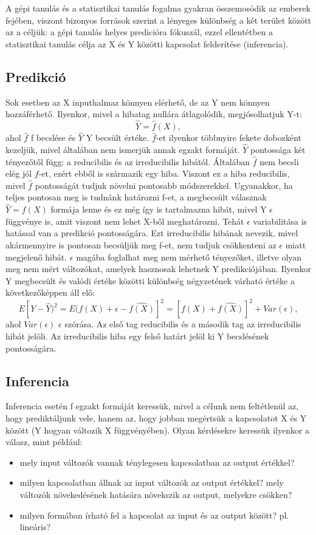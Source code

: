 \documentclass[12pt]{article}
\theoremstyle{plain}
\begin{document}
A gépi tanulás és a statisztikai tanulás fogalma gyakran összemosódik az emberek fejében, viszont bizonyos források szerint a lényeges különbség a két terület között az a céljük: a gépi tanulás helyes predicióra fókuszál, ezzel ellentétben a statisztikai tanulás célja az X és Y közötti kapcsolat felderítése (inferencia). 

\subsection{Predikció}
Sok esetben az X inputhalmaz könnyen elérhető, de az Y nem könnyen hozzáférhető. Ilyenkor, mivel a hibatag nullára átlagolódik, megjósolhatjuk Y-t: $$ \hat{Y} = \hat{f}(X), $$ ahol $\hat{f}$ f becslése és $\hat{Y}$ Y becsült értéke. $\hat{f}$-et ilyenkor többnyire fekete dobozként kezeljük, mivel általában nem ismerjük annak egzakt formáját. $\hat{Y}$ pontossága két tényezőtől függ: a reducibilis és az irreducibilis hibától. Általában $\hat{f}$ nem becsli elég jól $f$-et, ezért ebből is származik egy hiba. Viszont ez a hiba reducibilis, mivel $\hat{f}$ pontosságát tudjuk növelni pontosabb módszerekkel. Ugyanakkor, ha teljes pontosan meg is tudnánk határozni f-et, a megbecsült válasznak $\hat{Y} = f(X)$ formája lenne és ez még így is tartalmazna hibát, mivel Y $\epsilon$ függvénye is, amit viszont nem lehet X-ből meghatározni. Tehát $\epsilon$ variabilitása is hatással van a predikció pontosságára. Ezt irreducibilis hibának nevezik, mivel akármennyire is pontosan becsüljük meg f-et, nem tudjuk csökkenteni az $\epsilon$ miatt megjelenő hibát. $\epsilon$ magába foglalhat meg nem mérhető tényezőket, illetve olyan meg nem mért változókat, amelyek hasznosak lehetnek Y predikciójában. Ilyenkor Y megbecsült és valódi értéke közötti különbség négyzetének várható értéke a következőképpen áll elő: $$ E[Y-\hat{Y})^2= E(f(X)+\epsilon-\hat{f(X)}]^2=[f(X)+\hat{f(X)}]^2 + Var(\epsilon), $$ ahol $Var(\epsilon) $ $\epsilon$ szórása. Az első tag reducibilis és a második tag az irreducibilis hibát jelöli. %
Az irreducibilis hiba egy felső határt jelöl ki Y becslésének pontosságára. 

\subsection{Inferencia}
Inferencia esetén f egzakt formáját keressük, mivel a célunk nem feltétlenül az, hogy prediktáljunk vele, hanem az, hogy jobban megértsük a kapcsolatot X és Y között (Y hogyan változik X függvényében). Olyan kérdésekre keressük ilyenkor a válasz, mint például:  
\begin{itemize}
    \item mely input változók vannak ténylegesen kapcsolatban az output értékkel?
    \item milyen kapcsolatban állnak az input változók az output értékkel? mely változók növekedésének hatására növekszik az output, melyekre csökken?
    \item milyen formában írható fel a kapcsolat az input és az output között? pl. lineáris? 
\end{itemize}
\end{document}
